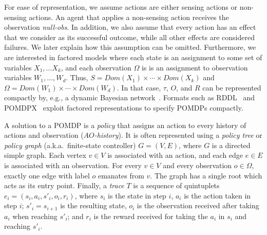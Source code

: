 \documentclass[letterpaper]{article}
\theoremstyle{definition}
\begin{document}
For ease of representation, we assume actions are either sensing actions or non-sensing actions. An agent that applies a non-sensing action receives the observation {\em null-obs}. In addition, we also assume that every action has 
an effect that we consider as its successful outcome, while all other effects are considered failures. We later explain how this assumption can be omitted. Furthermore, we are interested in factored models where each state is
an assignment to some set of variables $X_1,\ldots X_k$, and each observation $\Omega$ is
is an assignment to observation variables $W_1,\ldots, W_d$. 
Thus, $S=Dom(X_1)\times\cdots\times Dom(X_k)$ and
$\Omega = Dom(W_1)\times\cdots\times Dom(W_d)$. 
In that case, $\tau$, $O$, and $R$ can be represented compactly by, e.g., a dynamic Bayesian network~\cite{BAYESNETWORK}. Formats such as RDDL~\cite{RDDL} and POMDPX~\cite{POMDPX}
exploit factored representations to specify POMDPs compactly.


A solution to a POMDP is a {\em policy} that assigns an action to every history of actions and observation ({\em $AO$-history}). It is often represented using a {\em policy tree} or {\em policy graph} (a.k.a.~finite-state controller) $G=(V,E)$,
where $G$ is a directed simple graph. Each vertex $v\in V$ is associated with an action, and each edge $e\in E$ is associated with an observation.
For every $v\in V$ and every observation $o\in\Omega$, exactly one edge with label $o$ emanates from $v$.
The graph has a single root which acts as its entry point. 
Finally, a {\em trace} $T$ is a sequence of quintuplets $e_i = (s_i, a_i, s'_i, o_i, r_i)$,
where $s_i$ is the state in step $i$, 
$a_i$ is the action taken in step $i$;
    $s'_i=s_{i+1}$ is the resulting state,
    $o_i$ is the observation received after taking $a_i$ when reaching $s'_i$; and $r_i$ is the reward received for taking the $a_i$ in $s_i$ and reaching $s'_i$.
\end{document}
